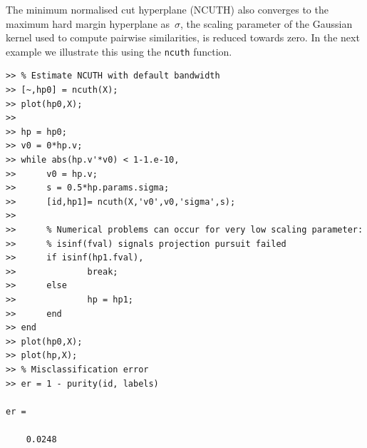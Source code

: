 \documentclass{book}
\begin{document}
The minimum normalised cut hyperplane (NCUTH) also
converges to the maximum hard margin hyperplane
as~$\sigma$, the scaling parameter
of the Gaussian kernel used to compute pairwise similarities, is reduced
towards zero. In the next example we illustrate this using the
{\tt ncuth} function.

\begin{verbatim}
>> % Estimate NCUTH with default bandwidth
>> [~,hp0] = ncuth(X);
>> plot(hp0,X);
>> 
>> hp = hp0;
>> v0 = 0*hp.v;
>> while abs(hp.v'*v0) < 1-1.e-10,
>>      v0 = hp.v;
>>      s = 0.5*hp.params.sigma;
>>      [id,hp1]= ncuth(X,'v0',v0,'sigma',s);
>>	
>>      % Numerical problems can occur for very low scaling parameter:
>>      % isinf(fval) signals projection pursuit failed 
>>      if isinf(hp1.fval),
>>              break;
>>      else
>>              hp = hp1;
>>      end
>> end
>> plot(hp0,X);
>> plot(hp,X);
>> % Misclassification error
>> er = 1 - purity(id, labels)

er =

    0.0248

\end{verbatim}
\end{document}
